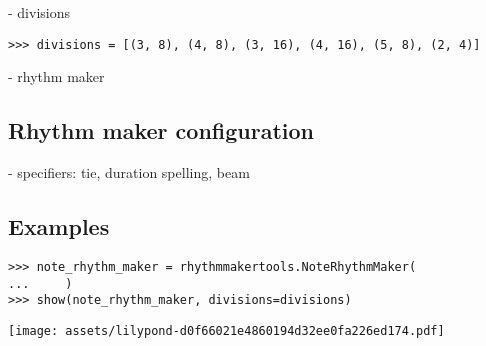 - divisions

\begin{comment}
<abjad>
divisions = [(3, 8), (4, 8), (3, 16), (4, 16), (5, 8), (2, 4)]
</abjad>
\end{comment}

\begin{singlespacing}
\vspace{-0.5\baselineskip}
\begin{lstlisting}
>>> divisions = [(3, 8), (4, 8), (3, 16), (4, 16), (5, 8), (2, 4)]
\end{lstlisting}
\end{singlespacing}

- rhythm maker

\subsection{Rhythm maker configuration} %

- specifiers: tie, duration spelling, beam

\subsection{Examples} %

\begin{comment}
<abjad>
note_rhythm_maker = rhythmmakertools.NoteRhythmMaker(
    )
show(note_rhythm_maker, divisions=divisions)
</abjad>
\end{comment}

\begin{singlespacing}
\vspace{-0.5\baselineskip}
\begin{lstlisting}
>>> note_rhythm_maker = rhythmmakertools.NoteRhythmMaker(
...     )
>>> show(note_rhythm_maker, divisions=divisions)
\end{lstlisting}
\texttt{[image: assets/lilypond-d0f66021e4860194d32ee0fa226ed174.pdf]}
\end{singlespacing}

\begin{comment}
<abjad>
even_division_rhythm_maker = rhythmmakertools.EvenDivisionRhythmMaker(
    denominators=[8, 16, 4],
    )
show(even_division_rhythm_maker, divisions=divisions)
</abjad>
\end{comment}

